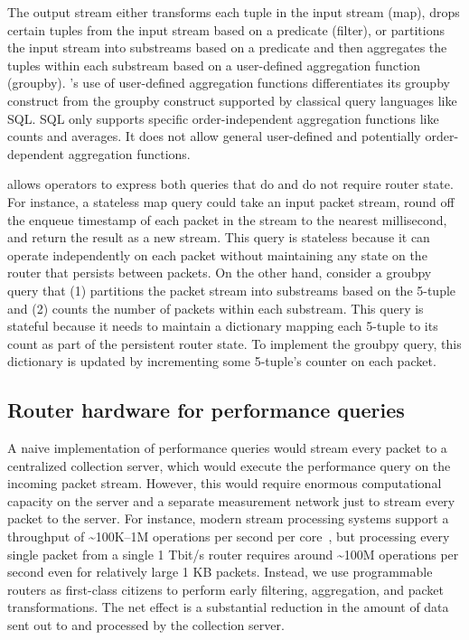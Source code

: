 The output stream either transforms each tuple in the input stream ({\ct map}),
drops certain tuples from the input stream based on a predicate ({\ct filter}),
or partitions the input stream into substreams based on a predicate and then
aggregates the tuples within each substream based on a user-defined aggregation
function ({\ct groupby}). \TheSystem's use of user-defined aggregation
functions differentiates its groupby construct from the groupby construct
supported by classical query languages like SQL. SQL only supports specific
order-independent aggregation functions like counts and averages. It does not
allow general user-defined and potentially order-dependent aggregation
functions. 

\TheSystem allows operators to express both queries that do and do not require
router state. For instance, a stateless {\ct map} query could take an input
packet stream, round off the enqueue timestamp of each packet in the stream to
the nearest millisecond, and return the result as a new stream.  This query is
stateless because it can operate independently on each packet without
maintaining any state on the router that persists between packets. On the other
hand, consider a {\ct groubpy} query that (1) partitions the packet stream into
substreams based on the 5-tuple and (2) counts the number of packets within
each substream. This query is stateful because it needs to maintain a
dictionary mapping each 5-tuple to its count as part of the persistent router
state. To implement the {\ct groubpy} query, this dictionary is updated by
incrementing some 5-tuple's counter on each packet.

\subsection{Router hardware for performance queries}
\label{ss:intro_pq_hardware}

A naive implementation of performance queries would stream every packet to a
centralized collection server, which would execute the performance query on the
incoming packet stream. However, this would require enormous computational
capacity on the server and a separate measurement network just to stream every
packet to the server. For instance, modern stream processing systems support a
throughput of \textasciitilde100K--1M operations per second per
core~\cite{kafka_benchmark, redis_benchmark, memcached_benchmark,
redis_vs_memcached_update, spark-streaming}, but processing every single packet
from a single 1 Tbit/s router requires around \textasciitilde100M operations
per second even for relatively large 1 KB packets. Instead, we use programmable
routers as first-class citizens to perform early filtering, aggregation, and
packet transformations. The net effect is a substantial reduction in the amount
of data sent out to and processed by the collection server.

